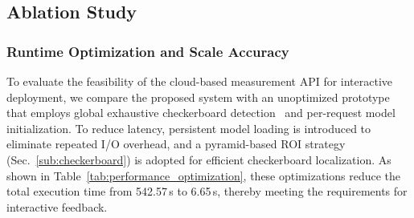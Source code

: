 \documentclass{article}
\begin{document}




\vspace{-0.3cm}

\subsection{Ablation Study}
\subsubsection{Runtime Optimization and Scale Accuracy}


To evaluate the feasibility of the cloud-based measurement API for interactive deployment, we compare the proposed system with an unoptimized prototype that employs global exhaustive checkerboard detection~\cite{OpenCV-Exhaustive} and per-request model initialization. To reduce latency, persistent model loading is introduced to eliminate repeated I/O overhead, and a pyramid-based ROI strategy (Sec.~\ref{sub:checkerboard}) is adopted for efficient checkerboard localization. As shown in Table~\ref{tab:performance_optimization}, these optimizations reduce the total execution time from 542.57\,s to 6.65\,s, thereby meeting the requirements for interactive feedback.
\end{document}
